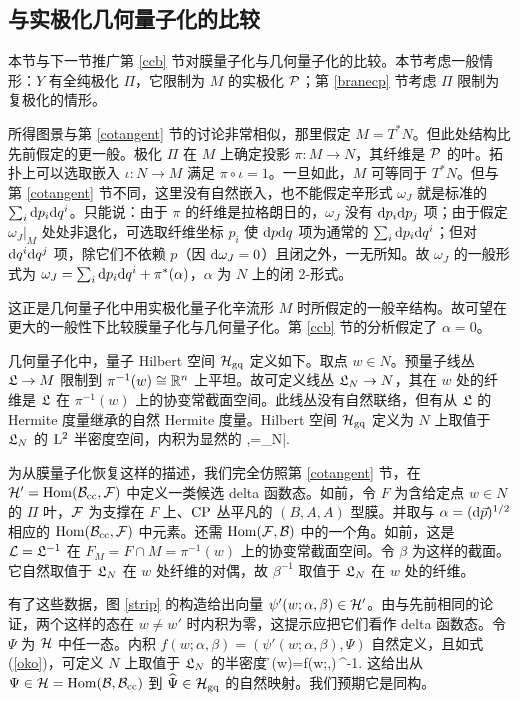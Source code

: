 \subsection{与实极化几何量子化的比较}\label{branerp}

本节与下一节推广第 \ref{ccb} 节对膜量子化与几何量子化的比较。本节考虑一般情形：$Y$ 有全纯极化 $\varPi$，它限制为 $M$ 的实极化 $\P$；第 \ref{branecp} 节考虑 $\varPi$ 限制为复极化的情形。

所得图景与第 \ref{cotangent} 节的讨论非常相似，那里假定 $M=T^*N$。但此处结构比先前假定的更一般。极化 $\varPi$ 在 $M$ 上确定投影 $\pi:M\to N$，其纤维是 $\P$ 的叶。拓扑上可以选取嵌入 $\iota:N\to M$ 满足 $\pi\circ\iota=1$。一旦如此，$M$ 可等同于 $T^*N$。但与第 \ref{cotangent} 节不同，这里没有自然嵌入，也不能假定辛形式 $\omega_J$ 就是标准的 $\sum_i\d p_i\d q^i$。只能说：由于 $\pi$ 的纤维是拉格朗日的，$\omega_J$ 没有 $\d p_i\d p_j$ 项；由于假定 $\omega_J|_M$ 处处非退化，可选取纤维坐标 $p_i$ 使 $\d p\d q$ 项为通常的 $\sum_i\d p_i\d q^i$；但对 $\d q^i\d q^j$ 项，除它们不依赖 $p$（因 $\d\omega_J=0$）且闭之外，一无所知。故 $\omega_J$ 的一般形式为 $\omega_J=\sum_i\d p_i\d q^i+\pi^*(\alpha)$，$\alpha$ 为 $N$ 上的闭 2-形式。

这正是几何量子化中用实极化量子化辛流形 $M$ 时所假定的一般辛结构。故可望在更大的一般性下比较膜量子化与几何量子化。第 \ref{ccb} 节的分析假定了 $\alpha=0$。

几何量子化中，量子 Hilbert 空间 $\H_{\gq}$ 定义如下。取点 $w\in N$。预量子线丛 $\frL\to M$ 限制到 $\pi^{-1}(w)\cong\R^n$ 上平坦。故可定义线丛 $\frL_N\to N$，其在 $w$ 处的纤维是 $\frL$ 在 $\pi^{-1}(w)$ 上的协变常截面空间。此线丛没有自然联络，但有从 $\frL$ 的 Hermite 度量继承的自然 Hermite 度量。Hilbert 空间 $\H_{\gq}$ 定义为 $N$ 上取值于 $\frL_N$ 的 $\ltwo$ 半密度空间，内积为显然的
\be\label{nho}\langle\chi,\psi\rangle=\int_N\bar\chi\psi. \ee

为从膜量子化恢复这样的描述，我们完全仿照第 \ref{cotangent} 节，在 $\H'=\Hom(\B_\cc,\cF)$ 中定义一类候选 delta 函数态。如前，令 $F$ 为含给定点 $w\in N$ 的 $\varPi$ 叶，$\cF$ 为支撑在 $F$ 上、$\CP$ 丛平凡的 $(B,A,A)$ 型膜。并取与 $\alpha=(\d\vec p)^{1/2}$ 相应的 $\Hom(\B_\cc,\cF)$ 中元素。还需 $\Hom(\cF,\B)$ 中的一个角。如前，这是 $\L=\frL^{-1}$ 在 $F_M=F\cap M=\pi^{-1}(w)$ 上的协变常截面空间。令 $\beta$ 为这样的截面。它自然取值于 $\frL_N$ 在 $w$ 处纤维的对偶，故 $\beta^{-1}$ 取值于 $\frL_N$ 在 $w$ 处的纤维。

有了这些数据，图 \ref{strip} 的构造给出向量 $\psi'(w;\alpha,\beta)\in\H'$。由与先前相同的论证，两个这样的态在 $w\ne w'$ 时内积为零，这提示应把它们看作 delta 函数态。令 $\Psi$ 为 $\H$ 中任一态。内积 $f(w;\alpha,\beta)=(\psi'(w;\alpha,\beta),\Psi)$ 自然定义，且如式 (\ref{oko})，可定义 $N$ 上取值于 $\frL_N$ 的半密度
\be\label{rno} \h\Psi(w)=f(w;\alpha,\beta)\,\beta^{-1}. \ee
这给出从 $\Psi\in\H=\Hom(\B,\B_\cc)$ 到 $\h\Psi\in\H_{\gq}$ 的自然映射。我们预期它是同构。

